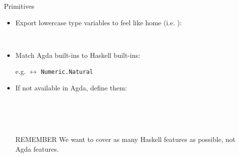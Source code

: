 \documentclass[aspectratio=169]{beamer}
\newcommand\hs[1]{\texttt{#1}}
\newcommand\resetVars{
  \def\sourceRatio{.5}
  \def\zoom{1}
  \def\hsFontsize{\normalsize}
  \def\midruleL{-1cm}
  \def\midruleR{.5cm}
  \def\sourceIcon{agda}
}
\begin{document}
\begin{frame}[fragile]{Primitives}

\begin{itemize}
\item Export lowercase type variables to feel like home
(i.e.   ):
\begin{code}%
\>[0]\AgdaSpace{}%
\AgdaSymbol{:}\AgdaSpace{}%
\AgdaSpace{}%
\AgdaSpace{}%
\<%
\\
\>[0]\AgdaSpace{}%
\AgdaSpace{}%
\AgdaSymbol{=}\AgdaSpace{}%
\<%
\end{code}

\pause
\item Match Agda built-ins to Haskell built-ins:

e.g.  $\leftrightarrow$ \hs{Numeric.Natural}

\pause
\item If not available in Agda, define them:

\begin{code}%
\>[0]\AgdaSpace{}%
\AgdaSpace{}%
\<%
\\
\>[0]\AgdaSpace{}%
\AgdaSymbol{:}\AgdaSpace{}%
\AgdaSpace{}%
\AgdaSpace{}%
\AgdaSpace{}%
\AgdaSpace{}%
\AgdaSpace{}%
\AgdaSpace{}%
\<%
\\
\>[0]\AgdaSpace{}%
\AgdaSpace{}%
\AgdaSpace{}%
\AgdaSpace{}%
\AgdaSpace{}%
\AgdaSpace{}%
\AgdaSymbol{=}\AgdaSpace{}%
\<%
\\
\>[0]\AgdaSpace{}%
%
\>[9]\AgdaSpace{}%
\AgdaSpace{}%
\AgdaSpace{}%
\AgdaSpace{}%
\AgdaSymbol{=}\AgdaSpace{}%
\<%
\end{code}

\pause
\begin{alertblock}{REMEMBER}
We want to cover as many Haskell features as possible, not Agda features.
\end{alertblock}

\end{itemize}

\resetVars
\end{frame}
\end{document}
